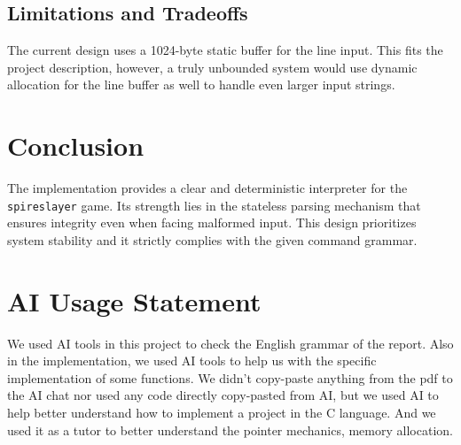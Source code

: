 \documentclass[a4paper,12pt]{article}
\begin{document}
\subsection{Limitations and Tradeoffs}

The current design uses a 1024-byte static buffer for the line input. This fits the project description, however, a truly unbounded system would use dynamic allocation for the line buffer as well to handle even larger input strings.

\section{Conclusion}

The implementation provides a clear and deterministic interpreter for the \texttt{spireslayer} game. Its strength lies in the stateless parsing mechanism that ensures integrity even when facing malformed input. This design prioritizes system stability and it strictly complies with the given command grammar.

\section*{AI Usage Statement}

We used AI tools in this project to check the English grammar of the report. Also in the implementation, we used AI tools to help us with the specific implementation of some functions. We didn't copy-paste anything from the pdf to the AI chat nor used any code directly copy-pasted from AI, but we used AI to help better understand how to implement a project in the C language. And we used it as a tutor to better understand the pointer mechanics, memory allocation.
\end{document}
